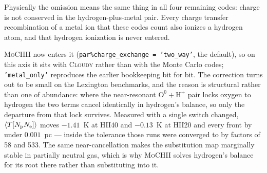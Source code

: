 \documentclass[english,a4paper]{my_memo}
\newcommand{\code}[1]{\texttt{#1}}
\newcommand{\MoCHII}{\textsc{MoCHII}}
\begin{document}
Physically the omission means the same thing in all four remaining codes:
charge is not conserved in the hydrogen-plus-metal pair.  Every charge transfer
recombination of a metal ion that these codes count also ionizes a hydrogen
atom, and that hydrogen ionization is never entered.

\MoCHII{} now enters it (\code{par\%charge\_exchange = 'two\_way'}, the
default), so on this axis it sits with \textsc{Cloudy} rather than with the
Monte Carlo codes; \code{'metal\_only'} reproduces the earlier bookkeeping bit
for bit.  The correction turns out to be small on the Lexington benchmarks, and
the reason is structural rather than one of abundance: where the near-resonant
$\mathrm{O}^0+\mathrm{H}^+$ pair locks oxygen to hydrogen the two terms cancel
identically in hydrogen's balance, so only the departure from that lock
survives.  Measured with a single switch changed,
$\langle T[N_{\rm p}N_{\rm e}]\rangle$ moves $-1.41$~K at HII40 and $-0.13$~K
at HII20 and every front by under $0.001$~pc --- inside the tolerance those runs
were converged to by factors of 58 and 533.  The same near-cancellation makes
the substitution map marginally stable in partially neutral gas, which is why
\MoCHII{} solves hydrogen's balance for its root there rather than substituting
into it.
\end{document}
